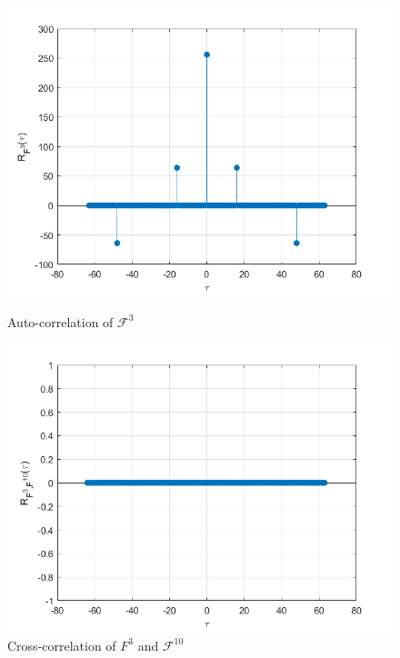 \documentclass[11pt]{article}
\newcommand{\2} {$2$-to-$1$}
\begin{document}
\begin{figure}[htbp]
	\begin{minipage}[t]{0.48\textwidth}
		\centering
		\includegraphics[width=1.1\textwidth,height=1.1\textwidth]{Figure1.png}
		\caption{Auto-correlation of $ \mathcal{F}^3 $}
		\label{Figure1}
	\end{minipage}
	\begin{minipage}[t]{0.48\textwidth}
		\centering
		\includegraphics[width=1.1\textwidth,height=1.1\textwidth]{Figure2.png}
		\caption{Cross-correlation of  $ F^3  $ and $ \mathcal{F}^{10} $}
		\label{Figure2}
	\end{minipage}
\end{figure}
\end{document}
